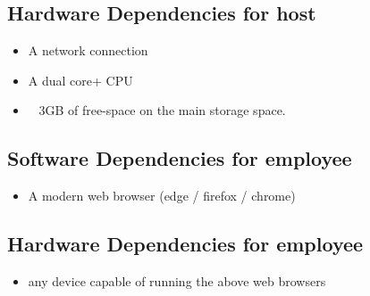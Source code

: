 \documentclass[letterpaper]{article}
\begin{document}
\subsection{Hardware Dependencies for host}
  \begin{itemize}
    \item A network connection
    \item A dual core+ CPU
    \item ~ 3GB of free-space on the main storage space.
  \end{itemize}

  \subsection{Software Dependencies for employee}
    \begin{itemize}
      \item A modern web browser (edge / firefox / chrome)
    \end{itemize}

    \subsection{Hardware Dependencies for employee}
      \begin{itemize}
        \item any device capable of running the above web browsers
      \end{itemize}

\pagebreak

\printindex
\listoffigures
\pagebreak
\end{document}
